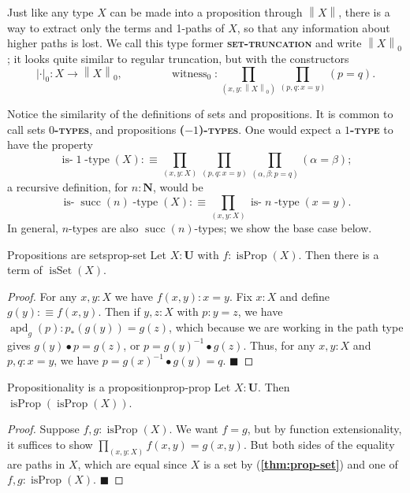 \documentclass{article}
\newcommand{\defn}[1]{{\scshape\bfseries\color{MPBemph}#1}}
\renewcommand{\qed}{\hfill{\color{MPBthm}\( \blacksquare \)}}
\newcommand{\eql}{\mathbin{:\equiv}}
\newcommand{\U}{\mathbf{U}}
\newcommand{\tpi}[1]{\prod_{(#1)}}
\newcommand{\1}{\textbf{1}}
\newcommand{\0}{\mathbf{0}}
\newcommand{\2}{\textbf{2}}
\newcommand{\N}{\textbf{N}}
\renewcommand{\succ}{\operatorname{succ}}
\DeclareMathOperator{\apd}{apd}
\newcommand{\abs}[1][\cdot]{\left|#1\right|}
\newcommand{\norm}[1][\cdot]{\left\|#1\right\|}
\DeclareMathOperator{\witness}{witness}
\DeclareMathOperator{\isProp}{isProp}
\DeclareMathOperator{\isSet}{isSet}
\newcommand{\isntype}[1][n]{\operatorname{is-}\!#1\!\operatorname{-type}}
\begin{document}
Just like any type \( X \) can be made into a proposition through \( \norm[X] \), there is a way to extract only the terms and 1-paths of \( X \), so that any information about higher paths is lost. We call this type former \defn{set-truncation} and write \( \norm[X]_{0} \); it looks quite similar to regular truncation, but with the constructors
\[ \abs_{0} : X \to \norm[X]_{0}, \hspace{50pt} \witness_{0} : \tpi{x, y : \norm[X]_{0}} \tpi{p, q : x = y} (p = q). \]

Notice the similarity of the definitions of sets and propositions. It is common to call sets \defn{\( 0 \)-types}, and propositions \defn{(\( -1 \))-types}. One would expect a \defn{\( 1 \)-type} to have the property
\[ \isntype[1](X) \eql \tpi{x, y : X} \tpi{p, q : x = y} \tpi{\alpha, \beta : p = q} (\alpha = \beta); \]
a recursive definition, for \( n : \N \), would be
\[ \isntype[\succ(n)](X) \eql \tpi{x, y : X} \isntype[n](x = y). \]
In general, \( n \)-types are also \( \succ(n) \)-types; we show the base case below.
\begin{thm}{Propositions are sets}{prop-set} Let \( X : \U \) with \( f : \isProp(X) \). Then there is a term of \( \isSet(X) \).
\begin{proof}
	For any \( x, y : X \) we have \( f(x, y) : x = y \). Fix \( x : X \) and define \( g(y) \eql f(x, y) \). Then if \( y, z : X \) with \( p : y = z \), we have \( \apd_{g}(p) : p_{\ast}(g(y)) = g(z) \), which because we are working in the path type gives \( g(y) \bullet p = g(z) \), or \( p = g(y)^{-1} \bullet g(z) \). Thus, for any \( x, y : X \) and \( p, q : x = y \), we have \( p = g(x)^{-1} \bullet g(y) = q \). \qed
\end{proof} \end{thm}
\begin{thm}{Propositionality is a proposition}{prop-prop} Let \( X : \U \). Then \( \isProp(\isProp(X)) \).
\begin{proof}
	Suppose \( f, g : \isProp(X) \). We want \( f = g \), but by function extensionality, it suffices to show \( \tpi{x, y : X} f(x, y) = g(x, y) \). But both sides of the equality are paths in \( X \), which are equal since \( X \) is a set by (\textbf{\color{MPBthm}\ref{thm:prop-set}}) and one of \( f, g : \isProp(X) \). \qed
\end{proof} \end{thm}
\end{document}
